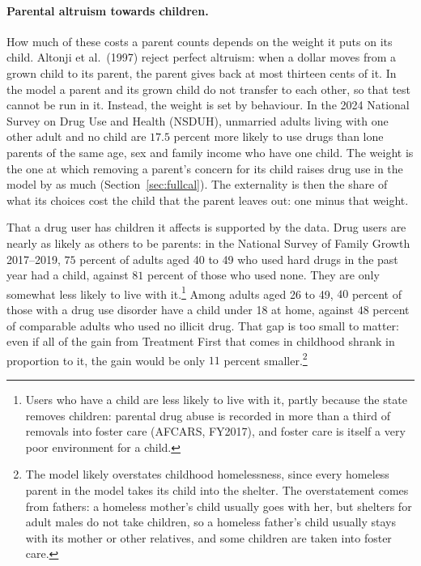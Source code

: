 \documentclass[10pt]{article}
\begin{document}
\paragraph{Parental altruism towards children.} How much of these costs a parent counts depends on the weight it puts on its child. Altonji et al.\ (1997) reject perfect altruism: when a dollar moves from a grown child to its parent, the parent gives back at most thirteen cents of it. In the model a parent and its grown child do not transfer to each other, so that test cannot be run in it. Instead, the weight is set by behaviour. In the 2024 National Survey on Drug Use and Health (NSDUH), unmarried adults living with one other adult and no child are $17.5$ percent more likely to use drugs than lone parents of the same age, sex and family income who have one child. The weight is the one at which removing a parent's concern for its child raises drug use in the model by as much (Section~\ref{sec:fullcal}). The externality is then the share of what its choices cost the child that the parent leaves out: one minus that weight.

That a drug user has children it affects is supported by the data. Drug users are nearly as likely as others to be parents: in the National Survey of Family Growth 2017--2019, $75$ percent of adults aged 40 to 49 who used hard drugs in the past year had a child, against $81$ percent of those who used none. They are only somewhat less likely to live with it.\footnote{Users who have a child are less likely to live with it, partly because the state removes children: parental drug abuse is recorded in more than a third of removals into foster care (AFCARS, FY2017), and foster care is itself a very poor environment for a child.} Among adults aged 26 to 49, $40$ percent of those with a drug use disorder have a child under 18 at home, against $48$ percent of comparable adults who used no illicit drug. That gap is too small to matter: even if all of the gain from Treatment First that comes in childhood shrank in proportion to it, the gain would be only $11$ percent smaller.\footnote{The model likely overstates childhood homelessness, since every homeless parent in the model takes its child into the shelter. The overstatement comes from fathers: a homeless mother's child usually goes with her, but shelters for adult males do not take children, so a homeless father's child usually stays with its mother or other relatives, and some children are taken into foster care.}
\end{document}
